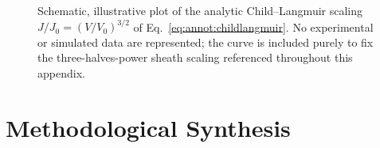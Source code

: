 \begin{figure}[htbp]
\centering
{}
\caption{Schematic, illustrative plot of the analytic Child--Langmuir scaling $J/J_{0} = (V/V_{0})^{3/2}$ of Eq.~\eqref{eq:annot:childlangmuir}. No experimental or simulated data are represented; the curve is included purely to fix the three-halves-power sheath scaling referenced throughout this appendix.}
\label{fig:annot:childlangmuir}
\end{figure}

\section{Methodological Synthesis}
\label{app:annot:synthesis}

